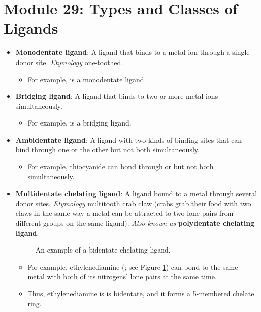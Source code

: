 \documentclass[../notes.tex]{subfiles}
\begin{document}
\section{Module 29: Types and Classes of Ligands}
\begin{itemize}
    \item \textbf{Monodentate ligand}: A ligand that binds to a metal ion through a single donor site. \emph{Etymology} one-toothed.
    \begin{itemize}
        \item For example,  is a monodentate ligand.
    \end{itemize}
    \item \textbf{Bridging ligand}: A ligand that binds to two or more metal ions simultaneously.
    \begin{itemize}
        \item For example,  is a bridging ligand.
    \end{itemize}
    \item \textbf{Ambidentate ligand}: A ligand with two kinds of binding sites that can bind through one or the other but not both simultaneously.
    \begin{itemize}
        \item For example, thiocyanide can bond through  or  but not both simultaneously.
    \end{itemize}
    \item \textbf{Multidentate chelating ligand}: A ligand bound to a metal through several donor sites. \emph{Etymology} multitooth crab claw (crabs grab their food with two claws in the same way a metal can be attracted to two lone pairs from different groups on the same ligand). \emph{Also known as} \textbf{polydentate chelating ligand}.
    \begin{figure}[H]
        \centering
        \caption{An example of a bidentate chelating ligand.}
        \label{fig:bidentateLigand}
    \end{figure}
    \begin{itemize}
        \item For example, ethylenediamine (; see Figure \ref{fig:bidentateLigand}) can bond to the same metal with both of its nitrogens' lone pairs at the same time.
        \item Thus, ethylenediamine is is bidentate, and it forms a 5-membered chelate ring.

\end{itemize}
\end{itemize}
\end{document}
